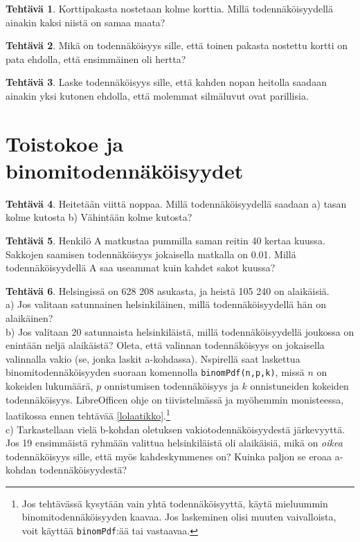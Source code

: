 \documentclass[12pt,leqno,a4paper,oneside]{amsart}
\theoremstyle{definition}
\newtheorem{exercise}{Tehtävä}
\theoremstyle{remark}
\numberwithin{equation}{section}
\begin{document}
\begin{exercise}
 Korttipakasta nostetaan kolme korttia. Millä toden\-näköisyydellä ainakin kaksi niistä on samaa maata?
\end{exercise}


\begin{exercise}
 Mikä on todennäköisyys sille, että toinen pakasta nostettu kortti on pata ehdolla, että ensimmäinen oli hertta?
\end{exercise}


\begin{exercise}
 Laske todennäköisyys sille, että kahden nopan heitolla saadaan ainakin yksi kutonen ehdolla, että molemmat silmäluvut ovat parillisia.
\end{exercise}



\section{Toistokoe ja binomitodennäköisyydet}

\begin{exercise}
 Heitetään viittä noppaa. Millä todennäköisyydellä saadaan a) tasan kolme kutosta b) Vähintään kolme kutosta?
\end{exercise}

\begin{exercise}
 Henkilö A matkustaa pummilla saman reitin 40 kertaa kuussa. Sakkojen saamisen todennäköisyys jokaisella matkalla on 0.01. Millä todennäköisyydellä
 A saa useammat kuin kahdet sakot kuussa?
\end{exercise}


\begin{exercise}
 Helsingissä on 628 208 asukasta, ja heistä 105 240 on alaikäisiä.\\
 a) Jos valitaan satunnainen helsinkiläinen, millä todennäköisyydellä hän on alaikäinen?\\
 b) Jos valitaan 20 satunnaista helsinkiläistä, millä todennäköisyydellä joukossa on enintään neljä alaikäistä?
 Oleta, että valinnan todennäköisyys on jokaisella valinnalla vakio (se, jonka laskit 
 a-kohdassa). Nspirellä saat laskettua binomitodennäköisyyden suoraan komennolla \texttt{binomPdf(n,p,k)}, missä $n$ on kokeiden lukumäärä,
 $p$ onnistumisen todennäköisyys ja $k$ onnistuneiden kokeiden todennäköisyys. LibreOfficen ohje on tiivistelmässä ja myöhemmin monisteessa, laatikossa ennen 
 tehtävää \ref{lolaatikko}.\footnote{Jos tehtävässä kysytään vain yhtä todennäköisyyttä, käytä mieluummin binomitodennäköisyyden kaavaa.
 Jos laskeminen olisi muuten vaivalloista, voit käyttää \texttt{binomPdf}:ää tai vastaavaa.}\\
 c) Tarkastellaan vielä b-kohdan oletuksen vakiotodennäköisyydestä jär\-ke\-vyyt\-tä. Jos 19 ensimmäistä ryhmään valittua helsinkiläistä oli alaikäisiä,
 mikä on \emph{oikea} todennäköisyys sille, että myös kahdeskymmenes on? Kuinka paljon se eroaa a-kohdan todennäköisyydestä?
\end{exercise}
\end{document}
